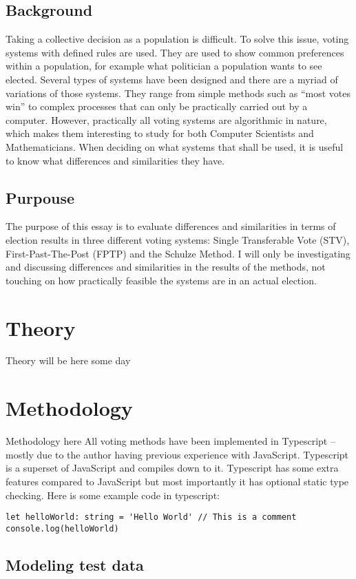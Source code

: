 \subsection{Background}
Taking a collective decision as a population is difficult. To solve this issue, voting systems with defined rules are used. They are used to show common preferences within a population, for example what politician a population wants to see elected. Several types of systems have been designed and there are a myriad of variations of those systems. They range from simple methods such as “most votes win” to complex processes that can only be practically carried out by a computer. However, practically all voting systems are algorithmic in nature, which makes them interesting to study for both Computer Scientists and Mathematicians. When deciding on what systems that shall be used, it is useful to know what differences and similarities they have.
\subsection{Purpouse}
The purpose of this essay is to evaluate differences and similarities in terms of election results in three different voting systems: Single Transferable Vote (STV), First-Past-The-Post (FPTP) and the Schulze Method. I will only be investigating and discussing differences and similarities in the results of the methods, not touching on how practically feasible the systems are in an actual election.
\pagebreak
\section{Theory}
Theory will be here some day
\section{Methodology}
Methodology here
All voting methods have been implemented in Typescript – mostly due to the author having previous experience with JavaScript. Typescript is a superset of JavaScript and compiles down to it. Typescript has some extra features compared to JavaScript but most importantly it has optional static type checking. Here is some example code in typescript:
\begin{lstlisting}
let helloWorld: string = 'Hello World' // This is a comment
console.log(helloWorld)
\end{lstlisting}
\subsection{Modeling test data}



